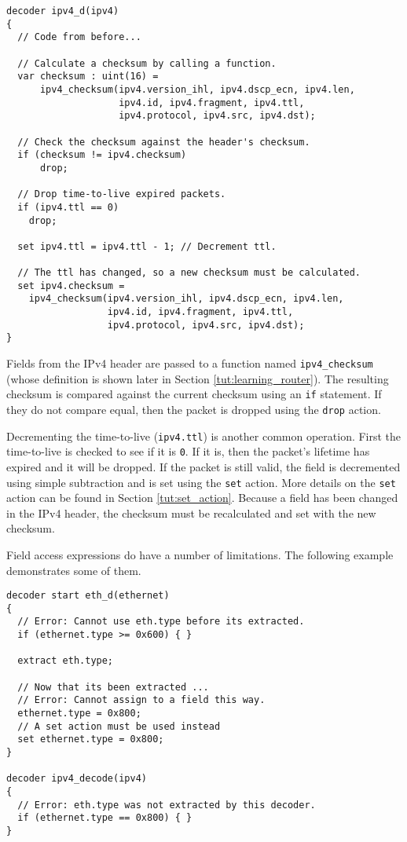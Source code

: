 \begin{codepage}
\begin{lstlisting}
decoder ipv4_d(ipv4)
{
  // Code from before...
  
  // Calculate a checksum by calling a function.
  var checksum : uint(16) =
 	  ipv4_checksum(ipv4.version_ihl, ipv4.dscp_ecn, ipv4.len, 
                    ipv4.id, ipv4.fragment, ipv4.ttl, 
                    ipv4.protocol, ipv4.src, ipv4.dst);

  // Check the checksum against the header's checksum.
  if (checksum != ipv4.checksum)
	  drop;

  // Drop time-to-live expired packets.
  if (ipv4.ttl == 0)
    drop;

  set ipv4.ttl = ipv4.ttl - 1; // Decrement ttl.

  // The ttl has changed, so a new checksum must be calculated.
  set ipv4.checksum =
    ipv4_checksum(ipv4.version_ihl, ipv4.dscp_ecn, ipv4.len, 
                  ipv4.id, ipv4.fragment, ipv4.ttl, 
                  ipv4.protocol, ipv4.src, ipv4.dst);
}
\end{lstlisting}
\end{codepage}

Fields from the IPv4 header are passed to a function named \texttt{ipv4\_checksum} (whose definition is shown later in Section \ref{tut:learning_router}). The resulting checksum is compared against the current checksum using an \texttt{if} statement. If they do not compare equal, then the packet is dropped using the \texttt{drop} action.

Decrementing the time-to-live (\texttt{ipv4.ttl}) is another common operation. First the time-to-live is checked to see if it is \texttt{0}. If it is, then the packet's lifetime has expired and it will be dropped. If the packet is still valid, the field is decremented using simple subtraction and is set using the \texttt{set} action. More details on the \texttt{set} action can be found in Section \ref{tut:set_action}. Because a field has been changed in the IPv4 header, the checksum must be recalculated and set with the new checksum.

Field access expressions do have a number of limitations. The following example
demonstrates some of them.

\begin{codepage}
\begin{lstlisting}
decoder start eth_d(ethernet)
{
  // Error: Cannot use eth.type before its extracted.
  if (ethernet.type >= 0x600) { }

  extract eth.type;

  // Now that its been extracted ...
  // Error: Cannot assign to a field this way.
  ethernet.type = 0x800;
  // A set action must be used instead
  set ethernet.type = 0x800;
}

decoder ipv4_decode(ipv4)
{
  // Error: eth.type was not extracted by this decoder.
  if (ethernet.type == 0x800) { }
}
\end{lstlisting}
\end{codepage}

